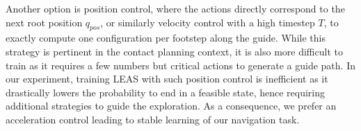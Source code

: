Another option is position control, where the actions directly correspond to the next root position $q_{pos}$, or similarly velocity control with a high timestep $T$, to exactly compute one configuration per footstep along the guide.
While this strategy is pertinent in the contact planning context, it is also more difficult to train as it requires a few numbers but critical actions to generate a guide path.
In our experiment, training LEAS with such position control is inefficient as it drastically lowers the probability to end in a feasible state, hence requiring additional strategies to guide the exploration.
As a consequence, we prefer an acceleration control leading to stable learning of our navigation task. 

